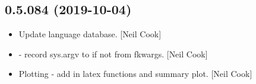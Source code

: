 \documentclass[a4paper,10pt,english]{report}
\begin{document}
\subsection{0.5.084 (2019-10-04)}
\label{\detokenize{misc/changelog:id59}}\begin{itemize}
\item {} 
Update language database. {[}Neil Cook{]}

\item {} 
 - record sys.argv to  if not
from fkwargs. {[}Neil Cook{]}

\item {} 
Plotting - add in latex functions and summary plot. {[}Neil Cook{]}

\end{itemize}
\end{document}
